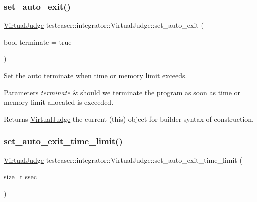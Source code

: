 \subsubsection{\texorpdfstring{set\_auto\_exit()}{set\_auto\_exit()}}
{\footnotesize\ttfamily \mbox{\hyperlink{classtestcaser_1_1integrator_1_1VirtualJudge}{Virtual\+Judge}} testcaser\+::integrator\+::\+Virtual\+Judge\+::set\+\_\+auto\+\_\+exit (\begin{DoxyParamCaption}\item[{bool}]{terminate = {\ttfamily true} }\end{DoxyParamCaption})\hspace{0.3cm}{\ttfamily [inline]}}



Set the auto terminate when time or memory limit exceeds. 


\begin{DoxyParams}{Parameters}
{\em terminate} & should we terminate the program as soon as time or memory limit allocated is exceeded. \\
\hline
\end{DoxyParams}
\begin{DoxyReturn}{Returns}
\mbox{\hyperlink{classtestcaser_1_1integrator_1_1VirtualJudge}{Virtual\+Judge}} the current (this) object for builder syntax of construction. 
\end{DoxyReturn}
\mbox{\label{classtestcaser_1_1integrator_1_1VirtualJudge_ac739270769d85fd09ae35aa53726f8f4}} 
\subsubsection{\texorpdfstring{set\_auto\_exit\_time\_limit()}{set\_auto\_exit\_time\_limit()}}
{\footnotesize\ttfamily \mbox{\hyperlink{classtestcaser_1_1integrator_1_1VirtualJudge}{Virtual\+Judge}} testcaser\+::integrator\+::\+Virtual\+Judge\+::set\+\_\+auto\+\_\+exit\+\_\+time\+\_\+limit (\begin{DoxyParamCaption}\item[{size\+\_\+t}]{ssec }\end{DoxyParamCaption})\hspace{0.3cm}{\ttfamily [inline]}}



